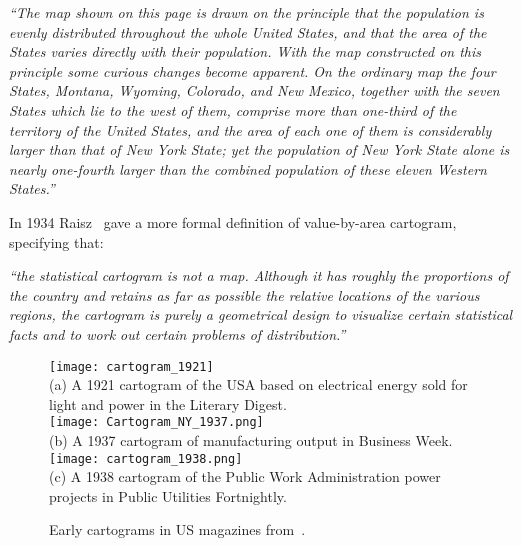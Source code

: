 \documentclass{egpubl}
\begin{document}
\hspace{0.01\textwidth}\parbox{0.45\textwidth}{\textit{``The map shown on this page is drawn on the principle that the population is evenly distributed throughout the whole United States, and that the area of the States varies directly with their population. With the map constructed on this principle some curious changes become apparent. On the ordinary map the four States, Montana, Wyoming, Colorado, and New Mexico, together with the seven States which lie to the west of them, comprise more than one-third of the territory of the United States, and the area of each one of them is considerably larger than that of New York State; yet the population of New York State alone is nearly one-fourth larger than the combined population of these eleven Western States.''}}





In 1934 Raisz~\cite{Raisz34} gave a more formal definition of value-by-area cartogram, specifying that:

\hspace{0.01\textwidth}\parbox{0.45\textwidth}{\textit{``the statistical cartogram is not a map. Although it has roughly the proportions of the country and retains as far as possible the relative locations of the various regions, the cartogram is purely a geometrical design to visualize certain statistical facts and to work out certain problems of distribution.''}}


\begin{figure}[htbp]
\begin{center}
\texttt{[image: cartogram\_1921]}\\
(a) A 1921 cartogram of the USA based on electrical energy sold for light and power in the Literary Digest.\\\vspace{.2cm}
\texttt{[image: Cartogram\_NY\_1937.png]}\\
(b) A 1937 cartogram of manufacturing output in Business Week.\\\vspace{.2cm}
\texttt{[image: cartogram\_1938.png]}\\
(c) A 1938 cartogram of the Public Work Administration power projects in Public Utilities Fortnightly.\\

\caption{Early cartograms in US magazines from~\cite{john_carto}.}
\vspace{-0.2cm}
\label{fig:businessweek}
\end{center}
\end{figure}
\end{document}
